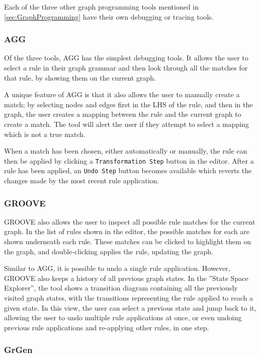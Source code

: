 \documentclass[authoryearcitations]{UoYCSproject}
\begin{document}
Each of the three other graph programming tools mentioned in
\autoref{sec:GraphProgramming} have their own debugging or tracing tools.

\subsubsection{AGG}

Of the three tools, AGG has the simplest debugging tools. It allows the user to
select a rule in their graph grammar and then look through all the matches for
that rule, by showing them on the current graph.

A unique feature of AGG is that it also allows the user to manually create a
match; by selecting nodes and edges first in the LHS of the rule, and then in
the graph, the user creates a mapping between the rule and the current graph to
create a match. The tool will alert the user if they attempt to select a mapping
which is not a true match.

When a match has been chosen, either automatically or manually, the rule can then
be applied by clicking a \texttt{Transformation Step} button in the editor. After
a rule has been applied, an \texttt{Undo Step} button becomes available which
reverts the changes made by the most recent rule application.

\subsubsection{GROOVE}

GROOVE also allows the user to inspect all possible rule matches for the current
graph. In the list of rules shown in the editor, the possible matches for each are
shown underneath each rule. These matches can be clicked to highlight them on the
graph, and double-clicking applies the rule, updating the graph.

Similar to AGG, it is possible to undo a single rule application. However, GROOVE
also keeps a history of all previous graph states. In the ''State Space Explorer'',
the tool shows a transition diagram containing all the previously visited graph
states, with the transitions representing the rule applied to reach a given state.
In this view, the user can select a previous state and jump back to it, allowing
the user to undo multiple rule applications at once, or even undoing previous rule
applications and re-applying other rules, in one step.

\subsubsection{GrGen}
\end{document}
